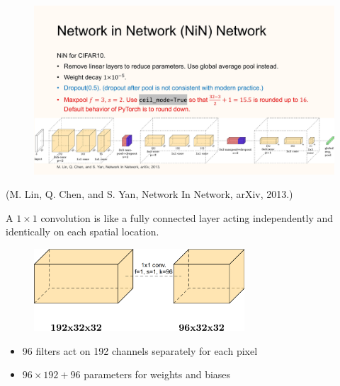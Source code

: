 \begin{definition}
    \begin{figure}[H]
        \centering
        \includegraphics[width=1.0\textwidth]{.././assets/7.10.jpg}
    \end{figure}

    (M. Lin, Q. Chen, and S. Yan, Network In Network, arXiv, 2013.)
\end{definition}

\begin{concept}
    A $1 \times 1$ convolution is like a fully connected layer acting independently and identically on each spatial location.

    \begin{figure}[H]
        \centering
        \includegraphics[width=0.7\textwidth]{.././assets/7.11.png}
    \end{figure}

    \begin{itemize}
        \item 96 filters act on 192 channels separately for each pixel
        \item $96 \times 192+96$ parameters for weights and biases
    \end{itemize}
\end{concept}

